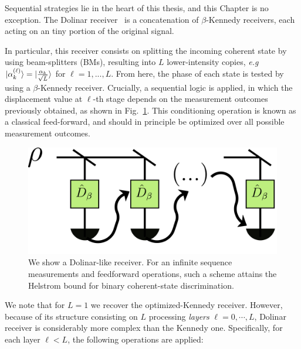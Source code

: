 Sequential strategies lie in the heart of this thesis, and this Chapter is no exception. The Dolinar receiver~\cite{Dolinar1973} is a concatenation of $\beta$-Kennedy receivers, each acting on an tiny portion of the original signal.

In particular, this receiver consists on splitting the incoming coherent state by using beam-splitters (BMs), resulting into $L$ lower-intensity copies, \textit{e.g} $\ket{\alpha_k^{(\ell)}} = \ket{\frac{\alpha_k}{\sqrt{L}}}$ for $\ell=1,...,L$. From here, the phase of each state is tested by using a $\beta$-Kennedy receiver. Crucially, a sequential logic is applied, in which the displacement value at $\ell$-th stage depends on the measurement outcomes previously obtained, as shown in Fig.~\ref{fig:313dolinar_setup}. This conditioning operation is known as a classical feed-forward, and should in principle be optimized over all possible measurement outcomes.
\begin{figure}[t!]
    \centering
    \includegraphics[width=.8\textwidth]{Figures/313/dolinar_receiver.pdf}
    \caption{We show a Dolinar-like receiver. For an infinite sequence measurements and feedforward operations, such a scheme attains the Helstrom bound for binary coherent-state discrimination.}
    \label{fig:313dolinar_setup}
\end{figure}
We note that for $L=1$ we recover the optimized-Kennedy receiver. However, because of its structure consisting on $L$ processing \textit{layers} $\ell=0,\cdots,L$, Dolinar receiver is considerably more complex than the Kennedy one. Specifically, for each layer $\ell<L$, the following operations are applied:

